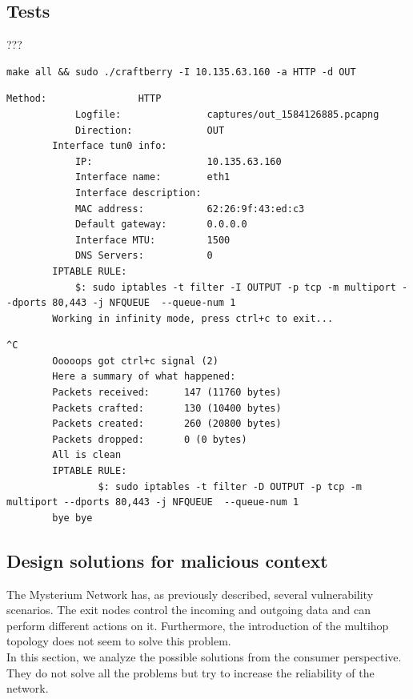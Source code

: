 \documentclass[12pt]{article}
\begin{document}
	\subsection{Tests}
		???
	
		\bigbreak
		\begin{lstlisting}[frame=single]
		make all && sudo ./craftberry -I 10.135.63.160 -a HTTP -d OUT
		\end{lstlisting}
		\bigbreak

		\bigbreak
		\begin{lstlisting}[frame=single]
		Method:                HTTP
			Logfile:               captures/out_1584126885.pcapng
			Direction:             OUT
		Interface tun0 info:
			IP:                    10.135.63.160
			Interface name:        eth1
			Interface description: 
			MAC address:           62:26:9f:43:ed:c3
			Default gateway:       0.0.0.0
			Interface MTU:         1500
			DNS Servers:           0
		IPTABLE RULE: 
			$: sudo iptables -t filter -I OUTPUT -p tcp -m multiport --dports 80,443 -j NFQUEUE  --queue-num 1
		Working in infinity mode, press ctrl+c to exit...
		\end{lstlisting}

		\bigbreak

		\begin{lstlisting}[frame=single]
		^C
		Ooooops got ctrl+c signal (2)
		Here a summary of what happened:
		Packets received:      147 (11760 bytes)
		Packets crafted:       130 (10400 bytes)
		Packets created:       260 (20800 bytes)
		Packets dropped:       0 (0 bytes)
		All is clean
		IPTABLE RULE: 
				$: sudo iptables -t filter -D OUTPUT -p tcp -m multiport --dports 80,443 -j NFQUEUE  --queue-num 1
		bye bye
		\end{lstlisting}
		\bigbreak

	\subsection{Design solutions for malicious context}

		The Mysterium Network has, as previously described, several vulnerability scenarios. The exit nodes control the incoming and outgoing data and can perform different actions on it. Furthermore, the introduction of the multihop topology does not seem to solve this problem.\\
		\bigbreak
		In this section, we analyze the possible solutions from the consumer perspective. They do not solve all the problems but try to increase the reliability of the network.\\
\end{document}
